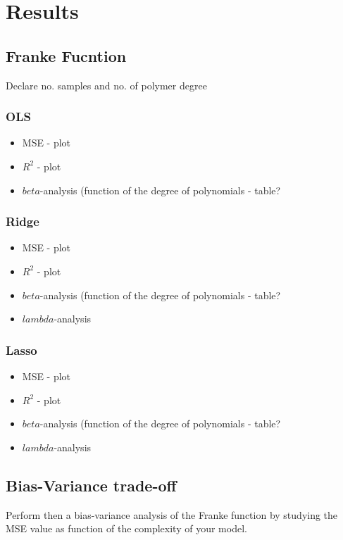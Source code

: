 \documentclass[aps,rmp,reprint,amsmath,amssymb,graphicx,longbibliography]{revtex4-1}
\begin{document}
\section{Results}
\subsection{Franke Fucntion}
Declare no. samples and no. of polymer degree

\subsubsection{OLS}
\begin{itemize}
    \item MSE - plot 
    \item $R^2$ - plot
    \item $beta$-analysis (function of the degree of polynomials - table?
\end{itemize}

\subsubsection{Ridge}
\begin{itemize}
    \item MSE - plot 
    \item $R^2$ - plot
    \item $beta$-analysis (function of the degree of polynomials - table?
    \item $lambda$-analysis
\end{itemize}

\subsubsection{Lasso}
\begin{itemize}
    \item MSE - plot 
    \item $R^2$ - plot
    \item $beta$-analysis (function of the degree of polynomials - table?
    \item $lambda$-analysis
\end{itemize}

\subsection{Bias-Variance trade-off}

Perform then a bias-variance analysis of the Franke function by studying the
MSE value as function of the complexity of your model.
\end{document}
